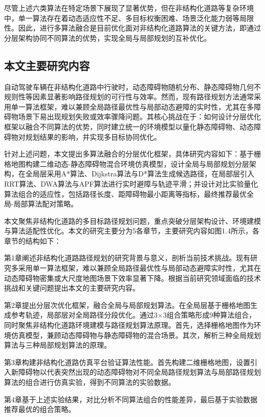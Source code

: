 \documentclass[lettersize,journal]{IEEEtran}
\begin{document}
尽管上述六类算法在特定场景下展现了显著优势，但在非结构化道路等复杂环境中，单一算法存在着动态适应性不足、多目标权衡困难、场景泛化能力弱等局限性。因此，进行多算法融合是目前优化面对非结构化道路算法的关键方法，即通过分层架构协同不同算法的优势，实现全局与局部规划的互补优化。

\subsection{本文主要研究内容}

自动驾驶车辆在非结构化道路中行驶时，动态障碍物随机分布、静态障碍物几何不规则性等因素显著影响路径规划的可行性与效率。然而，现有路径规划方法通常采用单一算法框架，难以兼顾全局路径最优性与局部动态避障的实时性，尤其在多障碍物场景下易出现规划失败或效率骤降问题。其核心挑战在于：如何设计分层优化框架以融合不同算法的优势，同时建立统一的环境模型以量化静态障碍物、动态障碍物对规划结果的影响，并实现多目标协同优化。

针对上述问题，本文提出多算法融合的分层优化框架，具体研究内容如下：基于栅格地图构建二维动态-静态障碍物混合环境仿真模型，设计全局与局部规划分层架构，在全局层采用A*算法、Dijkstra算法与D*算法生成候选路径，在局部层引入RRT算法、DWA算法与APF算法进行实时避障与轨迹平滑；并设计对比实验量化算法组合的适应性，包括路径长度、距障碍物最小距离等指标，最终推荐最优全局-局部算法配对策略。

本文聚焦非结构化道路的多目标路径规划问题，重点突破分层架构设计、环境建模与算法适配性优化。本文的研究主要分为5各章节，主要研究内容如图1.4所示，各章节的结构如下：

第1章阐述非结构化道路路径规划的研究背景与意义，剖析当前技术挑战。现有研究多采用单一算法框架，难以兼顾全局路径最优性与局部动态避障实时性，尤其在动态障碍物密集或大尺度地图场景下效率显著下降。根据当前研究领域面临的技术挑战和关键问题提出本文的主要研究内容。

第2章提出分层次优化框架，融合全局与局部规划算法。在全局层基于栅格地图生成参考轨迹，局部层对全局路径分段优化。通过3×3组合策略形成9种算法组合，同时聚焦非结构化道路环境建模与路径规划算法原理。首先，选择栅格地图作为环境仿真模型，兼顾动态障碍物与静态障碍物的混合场景。其次，解析三种全局规划算法与三种局部规划算法的原理。

第3章构建非结构化道路仿真平台验证算法性能。首先构建二维栅格地图，设置引入新障碍物以代表突然出现的动态障碍物对不同全局路径规划算法与局部路径规划算法的组合进行仿真实验，得到不同算法的实验数据。

第4章基于上述实验结果，对比分析不同算法组合的性能差异，最后基于实验数据推荐最优的组合策略。
\end{document}
